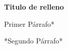 \documentclass[12pt]{article}
\begin{document}
    \begin{center}
        \textbf{Titulo de relleno}
    \end{center}

    \noindent *Primer Párrafo* 

    *Segundo Párrafo*    

    \lipsum \\

\end{document}
